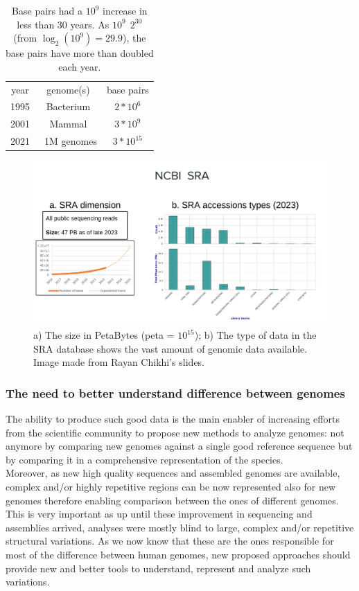 \begin{table}[h!]
	\centering
	\begin{tabular}{c | c | c}
		year & genome(s) & base pairs \\
		1995 & Bacterium & $ 2*10^6$ \\
		2001 & Mammal & $ 3*10^9$ \\
		2021 & ~1M genomes & $ 3*10^15$ \\
	\end{tabular}
	\caption[DNA data increase over the years.]{Base pairs had a $10^9$ increase in less than 30 years. As $10^9 ~~ 2^30$ (from $ \log_2(10^9) = 29.9$), the base pairs have more than doubled each year\cite{durbin_recomb}.}
	\label{tab:bp-increase}
\end{table}
\begin{figure}[h!]
	\centering
	\includegraphics[width=.95\linewidth]{figures/background/sra.png}
	\caption[The Sequence Read Archive.]{a) The size in PetaBytes (peta = $10^15$); b) The type of data in the SRA database shows the vast amount of genomic data available. Image made from Rayan Chikhi's slides.\\}
	\label{fig:SRA}
\end{figure}

\subsubsection{The need to better understand difference between genomes}
The ability to produce such good data is the main enabler of increasing efforts from the scientific community to propose new methods to analyze genomes: not anymore by comparing new genomes against a single good reference sequence but by comparing it in a comprehensive representation of the species. \\
Moreover, as new high quality sequences and assembled genomes are available, complex and/or highly repetitive regions can be now represented also for new genomes therefore enabling comparison between the ones of different genomes. This is very important as up until these improvement in sequencing and assemblies arrived, analyses were mostly blind to large, complex and/or repetitive structural variations. As we now know that these are the ones responsible for most of the difference between human genomes, new proposed approaches should provide new and better tools to understand, represent and analyze such variations.

